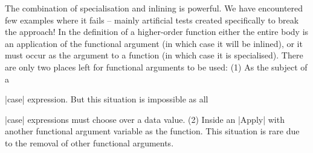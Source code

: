 The combination of specialisation and inlining is powerful. We have encountered few examples where it fails -- mainly artificial tests created specifically to break the approach! In the definition of a higher-order function either the entire body is an application of the functional argument (in which case it will be inlined), or it must occur as the argument to a function (in which case it is specialised). There are only two places left for functional arguments to be used: (1) As the subject of a \ignore|case| expression. But this situation is impossible as all \ignore|case| expressions must choose over a data value. (2) Inside an |Apply| with another functional argument variable as the function. This situation is rare due to the removal of other functional arguments.
